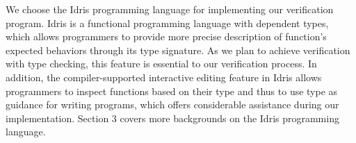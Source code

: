We choose the Idris programming language for implementing our verification program. Idris is a functional programming language with dependent types, which allows programmers to provide more precise description of function's expected behaviors through its type signature. As we plan to achieve verification with type checking, this feature is essential to our verification process. In addition, the compiler-supported interactive editing feature in Idris allows programmers to inspect functions based on their type and thus to use type as guidance for writing programs, which offers considerable assistance during our implementation. Section 3 covers more backgrounds on the Idris programming language. 



